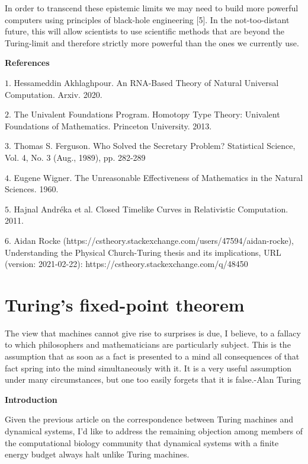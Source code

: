 \documentclass{article}
\begin{document}
In order to transcend these epistemic limits we may need to build more powerful computers using principles of black-hole
engineering [5]. In the not-too-distant future, this will allow scientists to use scientific methods that are beyond the Turing-limit and therefore strictly more powerful than the ones we currently use.

\textbf{References}

$1.$ Hessameddin Akhlaghpour. An RNA­-Based Theory of Natural Universal Computation. Arxiv. 2020.

$2.$ The Univalent Foundations Program. Homotopy Type Theory:
Univalent Foundations of Mathematics. Princeton University. 2013.

$3.$ Thomas S. Ferguson. Who Solved the Secretary Problem? Statistical Science, Vol. 4, No. 3 (Aug., 1989), pp. 282-289

$4.$ Eugene Wigner. The Unreasonable Effectiveness of Mathematics in the Natural Sciences. 1960.

$5.$ Hajnal Andréka et al. Closed Timelike Curves in Relativistic Computation. 2011.

$6.$ Aidan Rocke (https://cstheory.stackexchange.com/users/47594/aidan-rocke), Understanding the Physical Church-Turing thesis and its implications, URL (version: 2021-02-22): https://cstheory.stackexchange.com/q/48450

 
\newpage

\section{Turing's fixed-point theorem}

\begin{displayquote}
The view that machines cannot give rise to surprises is due, I believe, to a fallacy to which philosophers and mathematicians are particularly subject. This is the assumption that as soon as a fact is presented to a mind all consequences of that fact spring into the mind simultaneously with it. It is a very useful assumption under many circumstances, but one too easily forgets that it is false.-Alan Turing
\end{displayquote}

\textbf{Introduction}

Given the previous article on the correspondence between Turing machines and dynamical systems, I'd like to address the
remaining objection among members of the computational biology community that dynamical systems with a finite energy budget always halt unlike Turing machines.
\end{document}
